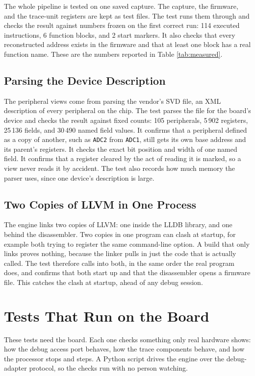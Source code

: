 The whole pipeline is tested on one saved capture. The capture, the firmware, and the trace-unit registers are kept as test files. The test runs them through and checks the result against numbers frozen on the first correct run: 114 executed instructions, 6 function blocks, and 2 start markers. It also checks that every reconstructed address exists in the firmware and that at least one block has a real function name. These are the numbers reported in Table \ref{tab:measured}.

\subsection{Parsing the Device Description}
The peripheral views come from parsing the vendor's SVD file, an XML description of every peripheral on the chip. The test parses the file for the board's device and checks the result against fixed counts: 105 peripherals, 5\,902 registers, 25\,136 fields, and 30\,490 named field values. It confirms that a peripheral defined as a copy of another, such as \texttt{ADC2} from \texttt{ADC1}, still gets its own base address and its parent's registers. It checks the exact bit position and width of one named field. It confirms that a register cleared by the act of reading it is marked, so a view never reads it by accident. The test also records how much memory the parser uses, since one device's description is large.

\subsection{Two Copies of LLVM in One Process}
The engine links two copies of LLVM: one inside the LLDB library, and one behind the disassembler. Two copies in one program can clash at startup, for example both trying to register the same command-line option. A build that only links proves nothing, because the linker pulls in just the code that is actually called. The test therefore calls into both, in the same order the real program does, and confirms that both start up and that the disassembler opens a firmware file. This catches the clash at startup, ahead of any debug session.


\section{Tests That Run on the Board}
\label{sec:ontarget_tier}
These tests need the board. Each one checks something only real hardware shows: how the debug access port behaves, how the trace components behave, and how the processor stops and steps. A Python script drives the engine over the debug-adapter protocol, so the checks run with no person watching.

